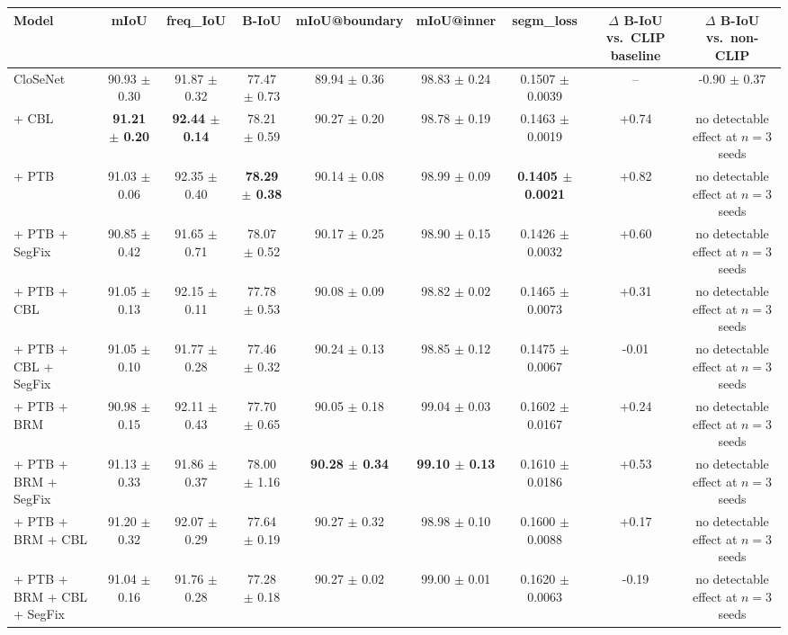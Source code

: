 \begin{tabular}{lcccccccc}
\toprule
Model & mIoU & freq\_IoU & B-IoU & mIoU@boundary & mIoU@inner & segm\_loss & $\Delta$ B-IoU vs.\ CLIP baseline & $\Delta$ B-IoU vs.\ non-CLIP \\
\midrule
CloSeNet & 90.93 $\pm$ 0.30 & 91.87 $\pm$ 0.32 & 77.47 $\pm$ 0.73 & 89.94 $\pm$ 0.36 & 98.83 $\pm$ 0.24 & 0.1507 $\pm$ 0.0039 & -- & -0.90 $\pm$ 0.37 \\
+ CBL & \textbf{91.21 $\pm$ 0.20} & \textbf{92.44 $\pm$ 0.14} & 78.21 $\pm$ 0.59 & 90.27 $\pm$ 0.20 & 98.78 $\pm$ 0.19 & 0.1463 $\pm$ 0.0019 & +0.74 & no detectable effect at $n{=}3$ seeds \\
+ PTB & 91.03 $\pm$ 0.06 & 92.35 $\pm$ 0.40 & \textbf{78.29 $\pm$ 0.38} & 90.14 $\pm$ 0.08 & 98.99 $\pm$ 0.09 & \textbf{0.1405 $\pm$ 0.0021} & +0.82 & no detectable effect at $n{=}3$ seeds \\
+ PTB + SegFix & 90.85 $\pm$ 0.42 & 91.65 $\pm$ 0.71 & 78.07 $\pm$ 0.52 & 90.17 $\pm$ 0.25 & 98.90 $\pm$ 0.15 & 0.1426 $\pm$ 0.0032 & +0.60 & no detectable effect at $n{=}3$ seeds \\
+ PTB + CBL & 91.05 $\pm$ 0.13 & 92.15 $\pm$ 0.11 & 77.78 $\pm$ 0.53 & 90.08 $\pm$ 0.09 & 98.82 $\pm$ 0.02 & 0.1465 $\pm$ 0.0073 & +0.31 & no detectable effect at $n{=}3$ seeds \\
+ PTB + CBL + SegFix & 91.05 $\pm$ 0.10 & 91.77 $\pm$ 0.28 & 77.46 $\pm$ 0.32 & 90.24 $\pm$ 0.13 & 98.85 $\pm$ 0.12 & 0.1475 $\pm$ 0.0067 & -0.01 & no detectable effect at $n{=}3$ seeds \\
+ PTB + BRM & 90.98 $\pm$ 0.15 & 92.11 $\pm$ 0.43 & 77.70 $\pm$ 0.65 & 90.05 $\pm$ 0.18 & 99.04 $\pm$ 0.03 & 0.1602 $\pm$ 0.0167 & +0.24 & no detectable effect at $n{=}3$ seeds \\
+ PTB + BRM + SegFix & 91.13 $\pm$ 0.33 & 91.86 $\pm$ 0.37 & 78.00 $\pm$ 1.16 & \textbf{90.28 $\pm$ 0.34} & \textbf{99.10 $\pm$ 0.13} & 0.1610 $\pm$ 0.0186 & +0.53 & no detectable effect at $n{=}3$ seeds \\
+ PTB + BRM + CBL & 91.20 $\pm$ 0.32 & 92.07 $\pm$ 0.29 & 77.64 $\pm$ 0.19 & 90.27 $\pm$ 0.32 & 98.98 $\pm$ 0.10 & 0.1600 $\pm$ 0.0088 & +0.17 & no detectable effect at $n{=}3$ seeds \\
+ PTB + BRM + CBL + SegFix & 91.04 $\pm$ 0.16 & 91.76 $\pm$ 0.28 & 77.28 $\pm$ 0.18 & 90.27 $\pm$ 0.02 & 99.00 $\pm$ 0.01 & 0.1620 $\pm$ 0.0063 & -0.19 & no detectable effect at $n{=}3$ seeds \\
\bottomrule
\end{tabular}
